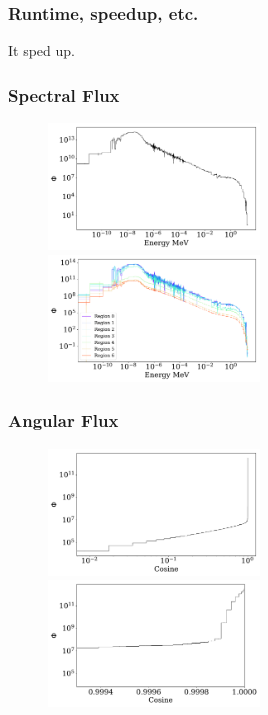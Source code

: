 \documentclass[fleqn]{beamer}
\begin{document}
\begin{frame}
\frametitle{Runtime, speedup, etc.}

It sped up.

\end{frame}

\begin{frame}
\frametitle{Spectral Flux}

\begin{figure}
\centering
\includegraphics[width = 0.5\textwidth]{flux_erg}
\includegraphics[width = 0.5\textwidth]{flux_rad_erg}
\caption{}
\end{figure}

\end{frame}

\begin{frame}
\frametitle{Angular Flux}

\begin{figure}
\centering
\includegraphics[width = 0.5\textwidth]{flux_cos}
\includegraphics[width = 0.5\textwidth]{flux_cos_detail}
\caption{}
\end{figure}

\end{frame}
\end{document}
